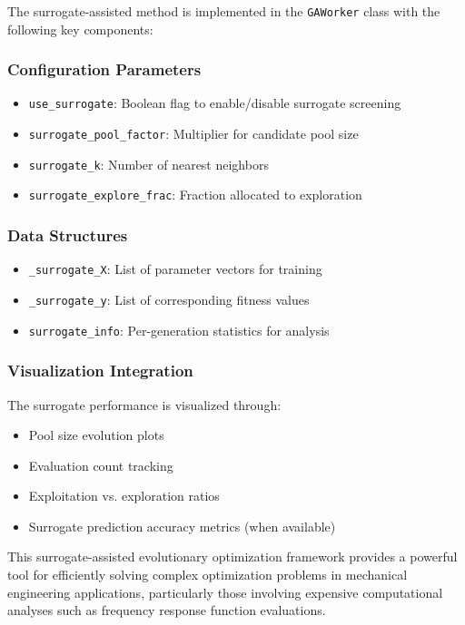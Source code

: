 \documentclass[12pt,a4paper]{article}
\begin{document}
The surrogate-assisted method is implemented in the \texttt{GAWorker} class with the following key components:

\subsubsection{Configuration Parameters}
\begin{itemize}
\item \texttt{use\_surrogate}: Boolean flag to enable/disable surrogate screening
\item \texttt{surrogate\_pool\_factor}: Multiplier for candidate pool size
\item \texttt{surrogate\_k}: Number of nearest neighbors
\item \texttt{surrogate\_explore\_frac}: Fraction allocated to exploration
\end{itemize}

\subsubsection{Data Structures}
\begin{itemize}
\item \texttt{\_surrogate\_X}: List of parameter vectors for training
\item \texttt{\_surrogate\_y}: List of corresponding fitness values
\item \texttt{surrogate\_info}: Per-generation statistics for analysis
\end{itemize}

\subsubsection{Visualization Integration}
The surrogate performance is visualized through:
\begin{itemize}
\item Pool size evolution plots
\item Evaluation count tracking
\item Exploitation vs. exploration ratios
\item Surrogate prediction accuracy metrics (when available)
\end{itemize}

This surrogate-assisted evolutionary optimization framework provides a powerful tool for efficiently solving complex optimization problems in mechanical engineering applications, particularly those involving expensive computational analyses such as frequency response function evaluations.
\end{document}
